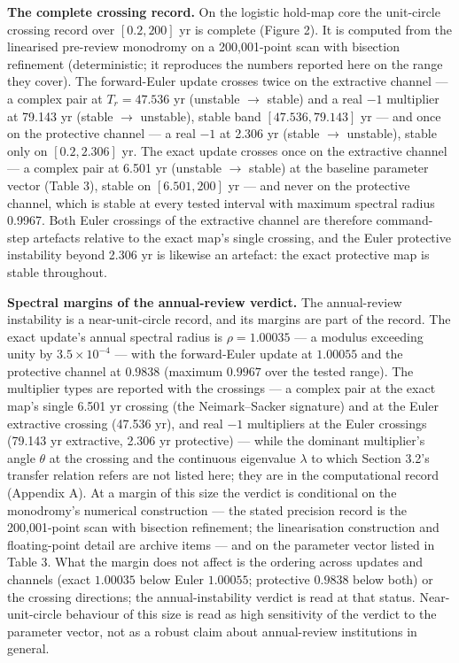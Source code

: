 \documentclass[11pt]{article}
\begin{document}
\textbf{The complete crossing record.} On the logistic
hold-map core the unit-circle crossing record over \([0.2, 200]\) yr is
complete (Figure 2). It is computed from the linearised pre-review
monodromy on a 200,001-point scan with bisection refinement (deterministic;
it reproduces the numbers reported here on the range they cover). The
forward-Euler update crosses twice on the extractive channel --- a
complex pair at \(T_r = 47.536\) yr (unstable \(\to\) stable) and a real
\(-1\) multiplier at 79.143 yr (stable \(\to\) unstable), stable band
\([47.536, 79.143]\) yr --- and once on the protective channel --- a real
\(-1\) at 2.306 yr (stable \(\to\) unstable), stable only on
\([0.2, 2.306]\) yr. The exact update crosses once on the
extractive channel --- a complex pair at 6.501 yr (unstable \(\to\) stable) at the baseline parameter vector (Table 3), stable on \([6.501, 200]\) yr --- and never on the protective
channel, which is stable at every tested interval with maximum spectral
radius 0.9967. Both Euler crossings of the extractive channel are
therefore command-step artefacts relative to the exact map's single
crossing, and the Euler protective instability beyond 2.306 yr is
likewise an artefact: the exact protective map is stable throughout.

\textbf{Spectral margins of the annual-review verdict.} The
annual-review instability is a near-unit-circle record, and its margins
are part of the record. The exact update's annual
spectral radius is \(\rho = 1.00035\) --- a modulus exceeding unity by
\(3.5\times 10^{-4}\) --- with the forward-Euler update at \(1.00055\)
and the protective channel at \(0.9838\) (maximum \(0.9967\) over the
tested range). The multiplier types are reported with the crossings ---
a complex pair at the exact map's single 6.501 yr crossing (the
Neimark--Sacker signature) and at the Euler extractive crossing (47.536 yr), and real \(-1\) multipliers at the Euler
crossings (79.143 yr extractive, 2.306 yr protective) --- while the
dominant multiplier's angle \(\theta\) at the crossing and the
continuous eigenvalue \(\lambda\) to which Section 3.2's transfer
relation refers are not listed here; they are in the
computational record (Appendix A). At a margin of this size the
verdict is conditional on the monodromy's numerical construction --- the
stated precision record is the 200,001-point scan with bisection
refinement; the linearisation construction and floating-point detail are
archive items --- and on the parameter vector listed in Table 3. What
the margin does not affect is the ordering across updates and
channels (exact \(1.00035\) below Euler \(1.00055\); protective
\(0.9838\) below both) or the crossing directions; the annual-instability verdict is read at that status. Near-unit-circle behaviour of this size is read as high sensitivity of the verdict to the parameter vector, not as a robust claim about annual-review institutions in general.
\end{document}
